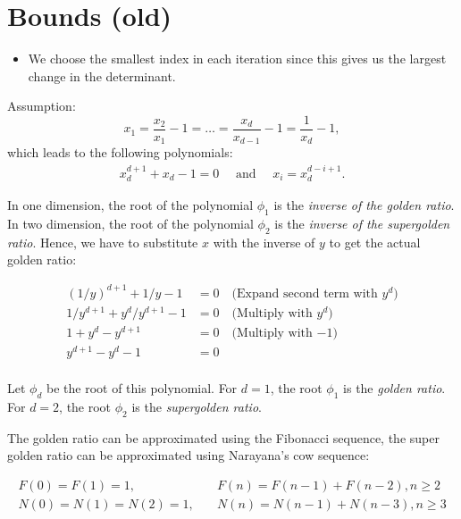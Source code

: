 \documentclass[english,version-2020-11]{uzl-thesis}
\begin{document}

\chapter{Bounds (old)}

\begin{itemize}
  \item We choose the smallest index in each iteration since this gives us the
    largest change in the determinant.
\end{itemize}

Assumption:
\[
  x_1 = \frac{x_2}{x_1} - 1 = \dots = \frac{x_{d}}{x_{d-1}} - 1 = \frac{1}{x_d} - 1,
\]
which leads to the following polynomials:
\begin{align}
  \label{eq:solution}
  x_d^{d+1} + x_d - 1 = 0 \quad \text{ and } \quad x_i = x_d^{d - i + 1}.
\end{align}

In one dimension, the root of the polynomial $\phi_1$ is the \emph{inverse of the golden ratio}.
In two dimension, the root of the polynomial $\phi_2$ is the \emph{inverse of the supergolden ratio}.
Hence, we have to substitute $x$ with the inverse of $y$ to get the actual golden ratio:

\begin{align*}
  (1/y)^{d+1} + 1/y - 1       & = 0 \quad \text{(Expand second term with $y^d$)} \\
  1/y^{d+1} + y^d/y^{d+1} - 1 & = 0 \quad \text{(Multiply with $y^d$)}           \\
  1 + y^d - y^{d+1}           & = 0 \quad \text{(Multiply with $-1$)}            \\
  y^{d+1} - y^d - 1           & = 0                                              \\
\end{align*}

Let $\phi_d$ be the root of this polynomial.
For $d = 1$, the root $\phi_1$ is the \emph{golden ratio}.
For $d = 2$, the root $\phi_2$ is the \emph{supergolden ratio}.

The golden ratio can be approximated using the Fibonacci sequence,
the super golden ratio can be approximated using Narayana's cow sequence:

\begin{align*}
  F(0) = F(1) = 1,        & \quad F(n) = F(n - 1) + F(n - 2), n \ge 2 \\
  N(0) = N(1) = N(2) = 1, & \quad N(n) = N(n - 1) + N(n - 3), n \ge 3
\end{align*}
\end{document}
